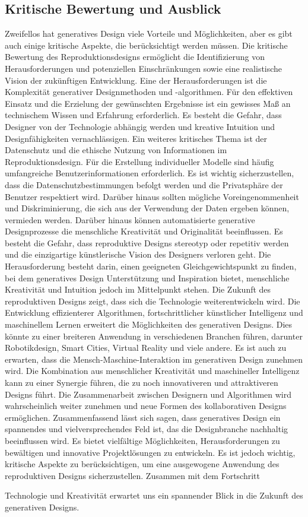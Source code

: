\subsection*{Kritische Bewertung und Ausblick}

Zweifellos hat generatives Design  viele Vorteile und Möglichkeiten, aber es gibt auch einige kritische Aspekte, die berücksichtigt werden müssen. Die kritische Bewertung des Reproduktionsdesigns ermöglicht die Identifizierung von Herausforderungen und potenziellen Einschränkungen sowie eine realistische Vision der zukünftigen Entwicklung. 
 Eine der Herausforderungen ist die Komplexität generativer Designmethoden und -algorithmen. Für den effektiven Einsatz und die Erzielung der gewünschten Ergebnisse ist ein gewisses Maß an technischem Wissen und Erfahrung erforderlich. Es besteht die Gefahr, dass Designer von der Technologie abhängig werden und  kreative Intuition und Designfähigkeiten vernachlässigen.  Ein weiteres kritisches Thema ist der Datenschutz und die ethische Nutzung von Informationen im Reproduktionsdesign. Für die Erstellung individueller Modelle sind häufig umfangreiche Benutzerinformationen erforderlich. Es ist wichtig sicherzustellen, dass die Datenschutzbestimmungen befolgt werden und die Privatsphäre der Benutzer respektiert wird. Darüber hinaus sollten mögliche Voreingenommenheit und Diskriminierung, die sich aus der Verwendung der Daten ergeben können, vermieden werden. 
 Darüber hinaus können automatisierte generative Designprozesse die menschliche Kreativität und Originalität beeinflussen. Es besteht die Gefahr, dass reproduktive Designs stereotyp oder repetitiv werden und die einzigartige künstlerische Vision des Designers verloren geht. Die Herausforderung besteht darin, einen geeigneten Gleichgewichtspunkt zu finden, bei dem generatives Design  Unterstützung und Inspiration bietet, menschliche Kreativität und Intuition jedoch im Mittelpunkt stehen. 
 Die Zukunft des reproduktiven Designs zeigt, dass sich die Technologie weiterentwickeln wird. Die Entwicklung effizienterer Algorithmen, fortschrittlicher künstlicher Intelligenz und maschinellem Lernen erweitert die Möglichkeiten des generativen Designs. Dies könnte zu einer breiteren Anwendung in verschiedenen Branchen führen, darunter Robotikdesign, Smart Cities, Virtual Reality und viele andere. Es ist auch zu erwarten, dass die Mensch-Maschine-Interaktion im generativen Design zunehmen wird. Die Kombination aus menschlicher Kreativität und maschineller Intelligenz kann zu einer Synergie führen, die zu noch innovativeren und attraktiveren Designs führt. Die Zusammenarbeit zwischen Designern und Algorithmen wird wahrscheinlich weiter zunehmen und neue Formen des kollaborativen Designs ermöglichen. 
 Zusammenfassend lässt sich sagen, dass generatives Design ein spannendes und vielversprechendes Feld ist, das die Designbranche nachhaltig beeinflussen wird. Es bietet vielfältige Möglichkeiten, Herausforderungen zu bewältigen und innovative Projektlösungen zu entwickeln. Es ist jedoch wichtig, kritische Aspekte zu berücksichtigen, um eine ausgewogene Anwendung des reproduktiven Designs sicherzustellen. Zusammen mit dem Fortschritt 
 
  Technologie und Kreativität erwartet uns ein spannender Blick in die Zukunft des generativen Designs.